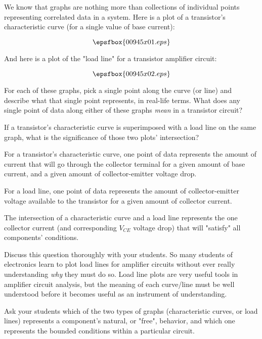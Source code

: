 

We know that graphs are nothing more than collections of individual points representing correlated data in a system.  Here is a plot of a transistor's characteristic curve (for a single value of base current):

$$\epsfbox{00945x01.eps}$$

And here is a plot of the "load line" for a transistor amplifier circuit:

$$\epsfbox{00945x02.eps}$$

For each of these graphs, pick a single point along the curve (or line) and describe what that single point represents, in real-life terms.  What does any single point of data along either of these graphs {\it mean} in a transistor circuit?

If a transistor's characteristic curve is superimposed with a load line on the same graph, what is the significance of those two plots' intersection?







For a transistor's characteristic curve, one point of data represents the amount of current that will go through the collector terminal for a given amount of base current, and a given amount of collector-emitter voltage drop.

\vskip 10pt

For a load line, one point of data represents the amount of collector-emitter voltage available to the transistor for a given amount of collector current.

\vskip 10pt

The intersection of a characteristic curve and a load line represents the one collector current (and corresponding $V_{CE}$ voltage drop) that will "satisfy" all components' conditions.







Discuss this question thoroughly with your students.  So many students of electronics learn to plot load lines for amplifier circuits without ever really understanding {\it why} they must do so.  Load line plots are very useful tools in amplifier circuit analysis, but the meaning of each curve/line must be well understood before it becomes useful as an instrument of understanding.

Ask your students which of the two types of graphs (characteristic curves, or load lines) represents a component's natural, or "free", behavior, and which one represents the bounded conditions within a particular circuit.  




